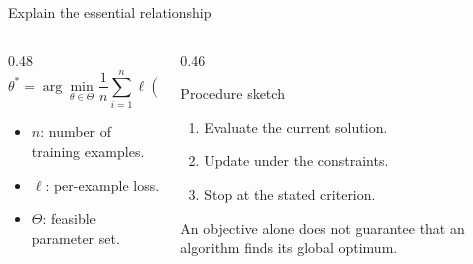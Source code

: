 \documentclass[aspectratio=169,10pt]{beamer}
\begin{document}
\begin{frame}{Explain the essential relationship}
  \begin{columns}[t,onlytextwidth]
    \begin{column}{0.48\textwidth}
      \[
        \theta^* = \arg\min_{\theta\in\Theta}
        \frac{1}{n}\sum_{i=1}^{n}\ell(f_\theta(x_i),y_i)
      \]
      \begin{itemize}
        \item $n$: number of training examples.
        \item $\ell$: per-example loss.
        \item $\Theta$: feasible parameter set.
      \end{itemize}
    \end{column}
    \begin{column}{0.46\textwidth}
      \begin{block}{Procedure sketch}
        \begin{enumerate}
          \item Evaluate the current solution.
          \item Update under the constraints.
          \item Stop at the stated criterion.
        \end{enumerate}
      \end{block}
      An objective alone does not guarantee that an algorithm finds its global optimum.
    \end{column}
  \end{columns}
\end{frame}
\end{document}
